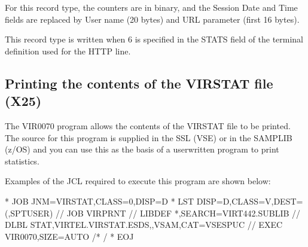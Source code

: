 \documentclass[letterpaper,10pt,english]{sphinxmanual}
\begin{document}
\sphinxAtStartPar
{}

\sphinxAtStartPar
For this record type, the counters are in binary, and the Session Date and Time fields are replaced by User name (20 bytes) and URL parameter (first 16 bytes).

\sphinxAtStartPar
This record type is written when 6 is specified in the STATS field of the terminal definition used for the HTTP line.

\ignorespaces 

\subsection{Printing the contents of the VIRSTAT file (X25)}
\label{\detokenize{audit_operations_ and_performance:printing-the-contents-of-the-virstat-file-x25}}\label{\detokenize{audit_operations_ and_performance:index-87}}
\sphinxAtStartPar
The VIR0070 program allows the contents of the VIRSTAT file to be printed. The source for this program is supplied in the SSL (VSE) or in the SAMPLIB (z/OS) and you can use this as the basis of a     user\sphinxhyphen{}written program to print statistics.

\sphinxAtStartPar
Examples of the JCL required to execute this program are shown below:

\begin{sphinxVerbatim}[commandchars=\\\{\}]
* \PYGZdl{}\PYGZdl{} JOB JNM=VIRSTAT,CLASS=0,DISP=D
* \PYGZdl{}\PYGZdl{} LST DISP=D,CLASS=V,DEST=(,SPTUSER)
// JOB VIRPRNT
// LIBDEF *,SEARCH=VIRT442.SUBLIB
// DLBL STAT,\PYGZsq{}VIRTEL.VIRSTAT.ESDS\PYGZsq{},,VSAM,CAT=VSESPUC
// EXEC VIR0070,SIZE=AUTO
/*
/\PYGZam{}
* \PYGZdl{}\PYGZdl{} EOJ
\end{sphinxVerbatim}

\sphinxAtStartPar
{}
\end{document}
